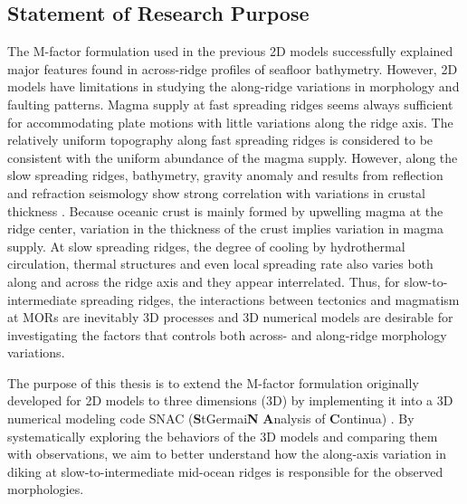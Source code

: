 \subsection{Statement of Research Purpose}

The M-factor formulation used in the previous 2D models \citep[e.g.,][]{Tucholke2008,Buck2005} successfully explained major features found in across-ridge profiles of seafloor bathymetry. However, 2D models have limitations in studying the along-ridge variations in morphology and faulting patterns. Magma supply at fast spreading ridges seems always sufficient for accommodating plate motions with little variations along the ridge axis. The relatively uniform topography along fast spreading ridges is considered to be consistent with the uniform abundance of the magma supply. However, along the slow spreading ridges, bathymetry, gravity anomaly and results from reflection and refraction seismology show strong correlation with variations in crustal thickness \citep[e.g.,][]{Ryan2009, Chen1999, Lin1990, Tolstoy1993}. Because oceanic crust is mainly formed by upwelling magma at the ridge center, variation in the thickness of the crust implies variation in magma supply. At slow spreading ridges, the degree of cooling by hydrothermal circulation, thermal structures and even local spreading rate \citep{Baines2008} also varies both along and across the ridge axis and they appear interrelated. Thus, for slow-to-intermediate spreading ridges, the interactions between tectonics and magmatism at MORs are inevitably 3D processes and 3D numerical models are desirable for investigating the factors that controls both across- and along-ridge morphology variations. 

The purpose of this thesis is to extend the M-factor formulation originally developed for 2D models to three dimensions (3D) by implementing it into a 3D numerical modeling code SNAC (\textbf{S}tGermai\textbf{N} \textbf{A}nalysis of \textbf{C}ontinua) \citep{Choi2008}. By systematically exploring the behaviors of the 3D models and comparing them with observations, we aim to better understand how the along-axis variation in diking at slow-to-intermediate mid-ocean ridges is responsible for the observed morphologies.

